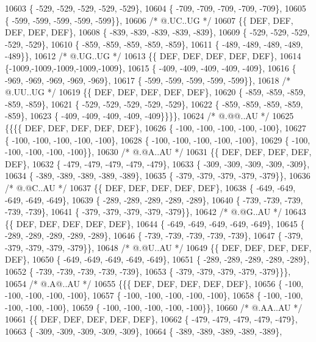 \begin{DoxyCode}
10603 \{ -529, -529, -529, -529, -529\},
10604 \{ -709, -709, -709, -709, -709\},
10605 \{ -599, -599, -599, -599, -599\}\},
10606 \textcolor{comment}{/*  @.UC..UG */}
10607 \{\{  DEF,  DEF,  DEF,  DEF,  DEF\},
10608 \{ -839, -839, -839, -839, -839\},
10609 \{ -529, -529, -529, -529, -529\},
10610 \{ -859, -859, -859, -859, -859\},
10611 \{ -489, -489, -489, -489, -489\}\},
10612 \textcolor{comment}{/*  @.UG..UG */}
10613 \{\{  DEF,  DEF,  DEF,  DEF,  DEF\},
10614 \{-1009,-1009,-1009,-1009,-1009\},
10615 \{ -409, -409, -409, -409, -409\},
10616 \{ -969, -969, -969, -969, -969\},
10617 \{ -599, -599, -599, -599, -599\}\},
10618 \textcolor{comment}{/*  @.UU..UG */}
10619 \{\{  DEF,  DEF,  DEF,  DEF,  DEF\},
10620 \{ -859, -859, -859, -859, -859\},
10621 \{ -529, -529, -529, -529, -529\},
10622 \{ -859, -859, -859, -859, -859\},
10623 \{ -409, -409, -409, -409, -409\}\}\}\},
10624 \textcolor{comment}{/*  @.@@..AU */}
10625 \{\{\{\{  DEF,  DEF,  DEF,  DEF,  DEF\},
10626 \{ -100, -100, -100, -100, -100\},
10627 \{ -100, -100, -100, -100, -100\},
10628 \{ -100, -100, -100, -100, -100\},
10629 \{ -100, -100, -100, -100, -100\}\},
10630 \textcolor{comment}{/*  @.@A..AU */}
10631 \{\{  DEF,  DEF,  DEF,  DEF,  DEF\},
10632 \{ -479, -479, -479, -479, -479\},
10633 \{ -309, -309, -309, -309, -309\},
10634 \{ -389, -389, -389, -389, -389\},
10635 \{ -379, -379, -379, -379, -379\}\},
10636 \textcolor{comment}{/*  @.@C..AU */}
10637 \{\{  DEF,  DEF,  DEF,  DEF,  DEF\},
10638 \{ -649, -649, -649, -649, -649\},
10639 \{ -289, -289, -289, -289, -289\},
10640 \{ -739, -739, -739, -739, -739\},
10641 \{ -379, -379, -379, -379, -379\}\},
10642 \textcolor{comment}{/*  @.@G..AU */}
10643 \{\{  DEF,  DEF,  DEF,  DEF,  DEF\},
10644 \{ -649, -649, -649, -649, -649\},
10645 \{ -289, -289, -289, -289, -289\},
10646 \{ -739, -739, -739, -739, -739\},
10647 \{ -379, -379, -379, -379, -379\}\},
10648 \textcolor{comment}{/*  @.@U..AU */}
10649 \{\{  DEF,  DEF,  DEF,  DEF,  DEF\},
10650 \{ -649, -649, -649, -649, -649\},
10651 \{ -289, -289, -289, -289, -289\},
10652 \{ -739, -739, -739, -739, -739\},
10653 \{ -379, -379, -379, -379, -379\}\}\},
10654 \textcolor{comment}{/*  @.A@..AU */}
10655 \{\{\{  DEF,  DEF,  DEF,  DEF,  DEF\},
10656 \{ -100, -100, -100, -100, -100\},
10657 \{ -100, -100, -100, -100, -100\},
10658 \{ -100, -100, -100, -100, -100\},
10659 \{ -100, -100, -100, -100, -100\}\},
10660 \textcolor{comment}{/*  @.AA..AU */}
10661 \{\{  DEF,  DEF,  DEF,  DEF,  DEF\},
10662 \{ -479, -479, -479, -479, -479\},
10663 \{ -309, -309, -309, -309, -309\},
10664 \{ -389, -389, -389, -389, -389\},

\end{DoxyCode}
